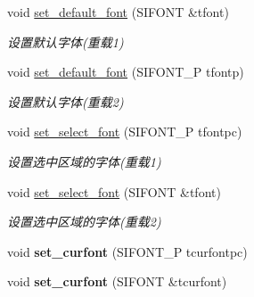 \begin{DoxyCompactItemize}
\mbox{\label{class_s_i_t_e_x_t_a3e04be8b17cd6702fc52158f9b3b276b}} 
void \hyperlink{class_s_i_t_e_x_t_a3e04be8b17cd6702fc52158f9b3b276b}{set\+\_\+default\+\_\+font} (S\+I\+F\+O\+NT \&tfont)
\begin{DoxyCompactList}\small\item\em 设置默认字体(重载1) \end{DoxyCompactList}\item 
\mbox{\label{class_s_i_t_e_x_t_a8fcd320042283b60f57630bdb8fd5bc8}} 
void \hyperlink{class_s_i_t_e_x_t_a8fcd320042283b60f57630bdb8fd5bc8}{set\+\_\+default\+\_\+font} (S\+I\+F\+O\+N\+T\+\_\+P tfontp)
\begin{DoxyCompactList}\small\item\em 设置默认字体(重载2) \end{DoxyCompactList}\item 
\mbox{\label{class_s_i_t_e_x_t_a4e33142038f2ba1d42660dec1134d2f9}} 
void \hyperlink{class_s_i_t_e_x_t_a4e33142038f2ba1d42660dec1134d2f9}{set\+\_\+select\+\_\+font} (S\+I\+F\+O\+N\+T\+\_\+P tfontpc)
\begin{DoxyCompactList}\small\item\em 设置选中区域的字体(重载1) \end{DoxyCompactList}\item 
\mbox{\label{class_s_i_t_e_x_t_a2b1208eb0796a08112449e7273b271df}} 
void \hyperlink{class_s_i_t_e_x_t_a2b1208eb0796a08112449e7273b271df}{set\+\_\+select\+\_\+font} (S\+I\+F\+O\+NT \&tfont)
\begin{DoxyCompactList}\small\item\em 设置选中区域的字体(重载2) \end{DoxyCompactList}\item 
\mbox{\label{class_s_i_t_e_x_t_a957ff893dd8fa93cbc9df1702a8b953d}} 
void {\bfseries set\+\_\+curfont} (S\+I\+F\+O\+N\+T\+\_\+P tcurfontpc)
\item 
\mbox{\label{class_s_i_t_e_x_t_a128951fbee38cb8ba2e389441acb3fd5}} 
void {\bfseries set\+\_\+curfont} (S\+I\+F\+O\+NT \&tcurfont)
\item 
\mbox{\label{class_s_i_t_e_x_t_abfd80c912a40b72c0cb113ad147b3d33}} 

\end{DoxyCompactItemize}
